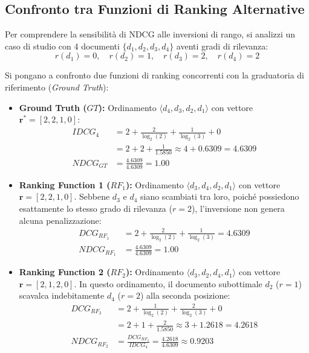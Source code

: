 \FloatBarrier
\subsection{Confronto tra Funzioni di Ranking Alternative}
\label{subsec:confronto-funzioni-ranking}

Per comprendere la sensibilit\`a di NDCG alle inversioni di rango, si analizzi un caso di studio con 4 documenti $\{d_1, d_2, d_3, d_4\}$ aventi gradi di rilevanza:
\begin{equation}
r(d_1) = 0, \quad r(d_2) = 1, \quad r(d_3) = 2, \quad r(d_4) = 2
\end{equation}

Si pongano a confronto due funzioni di ranking concorrenti con la graduatoria di riferimento (\textit{Ground Truth}):

\begin{itemize}
    \item \textbf{Ground Truth ($GT$):} Ordinamento $\langle d_4, d_3, d_2, d_1 \rangle$ con vettore $\mathbf{r}^* = [2, 2, 1, 0]$:
    \begin{align}
    IDCG_4 &= 2 + \frac{2}{\log_2(2)} + \frac{1}{\log_2(3)} + 0 \nonumber \\
    &= 2 + 2 + \frac{1}{1.5850} \approx 4 + 0.6309 = 4.6309 \nonumber \\
    NDCG_{GT} &= \frac{4.6309}{4.6309} = \mathbf{1.00}
    \end{align}
    \item \textbf{Ranking Function 1 ($RF_1$):} Ordinamento $\langle d_3, d_4, d_2, d_1 \rangle$ con vettore $\mathbf{r} = [2, 2, 1, 0]$.
    Sebbene $d_3$ e $d_4$ siano scambiati tra loro, poiché possiedono esattamente lo stesso grado di rilevanza ($r=2$), l'inversione non genera alcuna penalizzazione:
    \begin{align}
    DCG_{RF_1} &= 2 + \frac{2}{\log_2(2)} + \frac{1}{\log_2(3)} = 4.6309 \nonumber \\
    NDCG_{RF_1} &= \frac{4.6309}{4.6309} = \mathbf{1.00}
    \end{align}
    \item \textbf{Ranking Function 2 ($RF_2$):} Ordinamento $\langle d_3, d_2, d_4, d_1 \rangle$ con vettore $\mathbf{r} = [2, 1, 2, 0]$.
    In questo ordinamento, il documento subottimale $d_2$ ($r=1$) scavalca indebitamente $d_4$ ($r=2$) alla seconda posizione:
    \begin{align}
    DCG_{RF_2} &= 2 + \frac{1}{\log_2(2)} + \frac{2}{\log_2(3)} + 0 \nonumber \\
    &= 2 + 1 + \frac{2}{1.5850} \approx 3 + 1.2618 = 4.2618 \nonumber \\
    NDCG_{RF_2} &= \frac{DCG_{RF_2}}{IDCG_4} = \frac{4.2618}{4.6309} \approx \mathbf{0.9203}
    \end{align}
\end{itemize}

